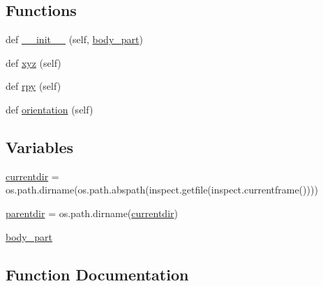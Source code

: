 \subsection*{Functions}
\begin{DoxyCompactItemize}
\item 
def \hyperlink{namespacepybullet-gym_1_1pybulletgym_1_1envs_1_1roboschool_1_1robots_1_1robot__bases_ab46b025529373206d9abc0a94c7de586}{\+\_\+\+\_\+init\+\_\+\+\_\+} (self, \hyperlink{namespacepybullet-gym_1_1pybulletgym_1_1envs_1_1roboschool_1_1robots_1_1robot__bases_a0827d502bd373ee972203bce479a71f9}{body\+\_\+part})
\item 
def \hyperlink{namespacepybullet-gym_1_1pybulletgym_1_1envs_1_1roboschool_1_1robots_1_1robot__bases_a800f3079fc9bd58874b4555bf3c8e5f8}{xyz} (self)
\item 
def \hyperlink{namespacepybullet-gym_1_1pybulletgym_1_1envs_1_1roboschool_1_1robots_1_1robot__bases_af7983ee10a2a5ce7f14ab07449b1bebf}{rpy} (self)
\item 
def \hyperlink{namespacepybullet-gym_1_1pybulletgym_1_1envs_1_1roboschool_1_1robots_1_1robot__bases_abd4cbcc66314feda5543ea5221592127}{orientation} (self)
\end{DoxyCompactItemize}
\subsection*{Variables}
\begin{DoxyCompactItemize}
\item 
\hyperlink{namespacepybullet-gym_1_1pybulletgym_1_1envs_1_1roboschool_1_1robots_1_1robot__bases_a9b4eac4485470868e78db11f63db99e9}{currentdir} = os.\+path.\+dirname(os.\+path.\+abspath(inspect.\+getfile(inspect.\+currentframe())))
\item 
\hyperlink{namespacepybullet-gym_1_1pybulletgym_1_1envs_1_1roboschool_1_1robots_1_1robot__bases_abe4ae4f51492ce02342ef77e29502d17}{parentdir} = os.\+path.\+dirname(\hyperlink{namespacepybullet-gym_1_1pybulletgym_1_1envs_1_1roboschool_1_1robots_1_1robot__bases_a9b4eac4485470868e78db11f63db99e9}{currentdir})
\item 
\hyperlink{namespacepybullet-gym_1_1pybulletgym_1_1envs_1_1roboschool_1_1robots_1_1robot__bases_a0827d502bd373ee972203bce479a71f9}{body\+\_\+part}
\end{DoxyCompactItemize}


\subsection{Function Documentation}

